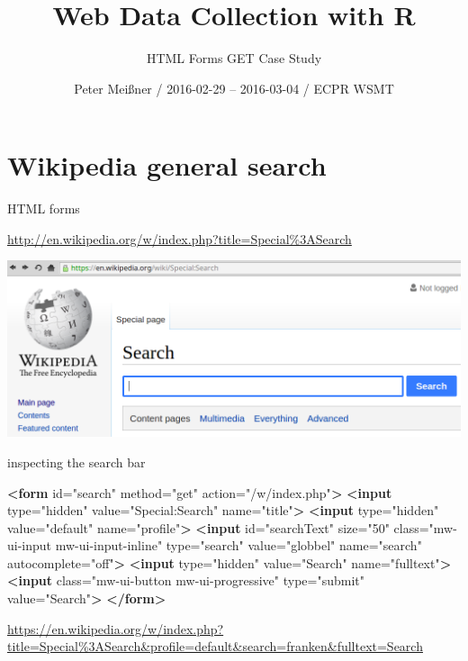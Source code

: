 \documentclass[ignorenonframetext,]{beamer}
\title{Web Data Collection with R}
\subtitle{HTML Forms GET Case Study}
\author{Peter Meißner / 2016-02-29 -- 2016-03-04 / ECPR WSMT}
\date{}
\newenvironment{Shaded}{\begin{snugshade}}{\end{snugshade}}
\newcommand{\KeywordTok}[1]{\textcolor[rgb]{0.13,0.29,0.53}{\textbf{{#1}}}}
\newcommand{\StringTok}[1]{\textcolor[rgb]{0.31,0.60,0.02}{{#1}}}
\newcommand{\OtherTok}[1]{\textcolor[rgb]{0.56,0.35,0.01}{{#1}}}
\begin{document}
\frame{\titlepage}

\begin{frame}
\tableofcontents[hideallsubsections]
\end{frame}

\section{Wikipedia general search}\label{wikipedia-general-search}

\begin{frame}{HTML forms}

\url{http://en.wikipedia.org/w/index.php?title=Special\%3ASearch}

\includegraphics{fig/wikipediasearch.png}

\end{frame}

\begin{frame}[fragile]{inspecting the search bar}

\begin{Shaded}
\begin{Highlighting}[]
\KeywordTok{<form}\OtherTok{ id=}\StringTok{"search"}\OtherTok{ method=}\StringTok{"get"}\OtherTok{ action=}\StringTok{"/w/index.php"}\KeywordTok{>}
  \KeywordTok{<input}\OtherTok{ type=}\StringTok{"hidden"}\OtherTok{ value=}\StringTok{"Special:Search"}\OtherTok{ name=}\StringTok{"title"}\KeywordTok{>}
  \KeywordTok{<input}\OtherTok{ type=}\StringTok{"hidden"}\OtherTok{ value=}\StringTok{"default"}\OtherTok{ name=}\StringTok{"profile"}\KeywordTok{>}
  \KeywordTok{<input}\OtherTok{ id=}\StringTok{"searchText"}\OtherTok{ size=}\StringTok{"50"}\OtherTok{ class=}\StringTok{"mw-ui-input mw-ui-input-inline"}\OtherTok{ type=}\StringTok{"search"}\OtherTok{ value=}\StringTok{"globbel"}\OtherTok{ name=}\StringTok{"search"}\OtherTok{ autocomplete=}\StringTok{"off"}\KeywordTok{>}
  \KeywordTok{<input}\OtherTok{ type=}\StringTok{"hidden"}\OtherTok{ value=}\StringTok{"Search"}\OtherTok{ name=}\StringTok{"fulltext"}\KeywordTok{>}
  \KeywordTok{<input}\OtherTok{ class=}\StringTok{"mw-ui-button mw-ui-progressive"}\OtherTok{ type=}\StringTok{"submit"}\OtherTok{ value=}\StringTok{"Search"}\KeywordTok{>}
\KeywordTok{</form>}
\end{Highlighting}
\end{Shaded}

\url{https://en.wikipedia.org/w/index.php?title=Special\%3ASearch\&profile=default\&search=franken\&fulltext=Search}

\end{frame}
\end{document}
